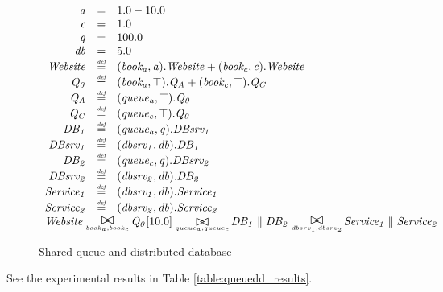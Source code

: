 \begin{figure}
	\caption{Shared queue and distributed database}
	\label{figure:queuedd}
	\centering
	\begin{displaymath}
	\begin{array}{rcl}
	\mathit{a} & = & 1.0-10.0\\
	\mathit{c} & = & 1.0\\
	\mathit{q} & = & 100.0\\
	\mathit{db} & = & 5.0\\
	[0.0ex]		\mathit{Website} & \rmdef & (\mathit{book_a},\mathit{a}).\mathit{Website}+(\mathit{book_c},\mathit{c}).\mathit{Website}\\
	\mathit{Q_0} & \rmdef & (\mathit{book_a},\top).\mathit{Q_A}+(\mathit{book_c},\top).\mathit{Q_C}\\
	\mathit{Q_A} & \rmdef & (\mathit{queue_a},\top).\mathit{Q_0}\\
	\mathit{Q_C} & \rmdef & (\mathit{queue_c},\top).\mathit{Q_0}\\
	\mathit{DB_1} & \rmdef & (\mathit{queue_a},\mathit{q}).\mathit{DBsrv_1}\\
	\mathit{DBsrv_1} & \rmdef & (\mathit{dbsrv_1},\mathit{db}).\mathit{DB_1}\\
	\mathit{DB_2} & \rmdef & (\mathit{queue_c},\mathit{q}).\mathit{DBsrv_2}\\
	\mathit{DBsrv_2} & \rmdef & (\mathit{dbsrv_2},\mathit{db}).\mathit{DB_2}\\
	\mathit{Service_1} & \rmdef & (\mathit{dbsrv_1},\mathit{db}).\mathit{Service_1}\\
	\mathit{Service_2} & \rmdef & (\mathit{dbsrv_2},\mathit{db}).\mathit{Service_2}\\
	[0.0ex]		\multicolumn{3}{l}{\mathit{Website}\sync{book_a,book_c}\mathit{Q_0}[10.0]\sync{queue_a,queue_c}\mathit{DB_1}\parallel\mathit{DB_2}\sync{dbsrv_1,dbsrv_2}\mathit{Service_1}\parallel\mathit{Service_2}}\\
	[0.0ex]	\end{array}
	\end{displaymath}
\end{figure}

See the experimental results in Table \ref{table:queuedd_results}.

